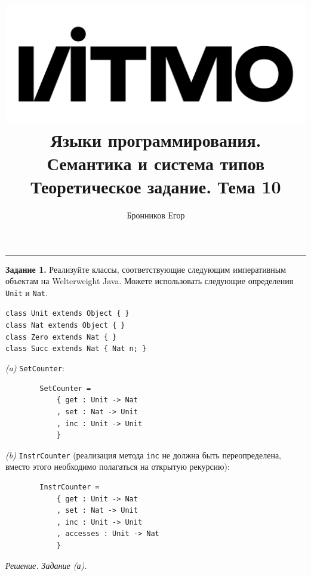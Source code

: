 \documentclass[landscape, 11pt]{report}
\title{
	\includegraphics[scale=0.07]{logo}\\
	\vspace{0.5em}
	Языки программирования. Семантика и система типов\\
	\vspace{0.2em}
	\Large Теоретическое задание. Тема 10
}
\author{Бронников Егор}
\date{}
\begin{document}
	
	
	\maketitle
	
	\vspace{-0.5cm}
	\hrule
	\vspace{0.5cm}
	
	
	\textbf{Задание 1.} Реализуйте классы, соответствующие следующим императивным объектам на Welterweight Java. Можете использовать следующие определения \verb|Unit| и \verb|Nat|.
	
	\vspace{0.2cm}
	
	\verb|class Unit extends Object { }| \\
	\verb|class Nat extends Object { }| \\
	\verb|class Zero extends Nat { }| \\
	\verb|class Succ extends Nat { Nat n; }|
	
	\vspace{0.2cm}
	
	\textit{(a)} \verb|SetCounter|:
	
	\begin{verbatim}
		SetCounter =
		    { get : Unit -> Nat
		    , set : Nat -> Unit
		    , inc : Unit -> Unit
		    }
	\end{verbatim}
	
	\vspace{-0.1cm}
	
	\textit{(b)} \verb|InstrCounter| (реализация метода \verb|inc| не должна быть переопределена, вместо этого необходимо полагаться на открытую рекурсию):
	
	\begin{verbatim}
		InstrCounter =
		    { get : Unit -> Nat
		    , set : Nat -> Unit
		    , inc : Unit -> Unit
		    , accesses : Unit -> Nat
		    }
	\end{verbatim}
	
	\vspace{-0.1cm}

	\newpage

	\textit{Решение. Задание (а).}
	
	\vspace{-0.2cm}
	
\end{document}

